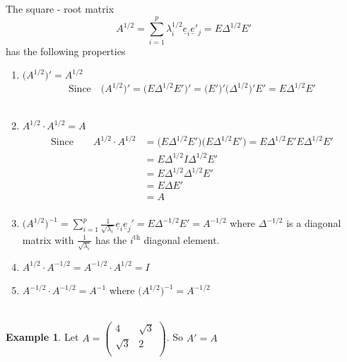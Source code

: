 \documentclass[11pt,a4paper]{article}
\theoremstyle{definition}
\newtheorem{exa}[thm]{Example}
\begin{document}
The square - root matrix \begin{equation}\tag{2}
A^{1/2} = \sum^p_{i=1}\lambda^{1/2}_i\underline{e}_i\underline{e}'_j = E\Delta^{1/2} E'
\end{equation} has the following properties
\begin{enumerate}
\item $\big(A^{1/2}\big)' = A^{1/2}$ 
$$\text{Since}\quad \big(A^{1/2}\big)' = \big(E\Delta^{1/2}E'\big)' = \big(E'\big)'\big(\Delta^{1/2}\big)'E' = E\Delta^{1/2}E'$$\\

\item $A^{1/2}\cdot A^{1/2} = A$
\begin{align*}
\text{Since}\qquad   A^{1/2}\cdot A^{1/2} & = \big(E\Delta^{1/2}E'\big)\big(E\Delta^{1/2}E'\big) = E\Delta^{1/2}E'E\Delta^{1/2}E'\\
& = E\Delta^{1/2}I\Delta^{1/2}E'\\
& = E \Delta^{1/2}\Delta^{1/2}E'\\
& = E \Delta E'\\
& = A\\
\end{align*}

\item $\displaystyle{\big(A^{1/2}\big)^{-1} = \sum^p_{i=1}\frac{1}{\sqrt{\lambda_i}}\underline{e}_i\underline{e}_j' = E\Delta^{-1/2}E' = A^{-1/2}}$ where $\Delta^{-1/2}$ is a diagonal matrix with $\frac{1}{\sqrt{\lambda_i}}$ has the $i^{\text{th}}$ diagonal element.\\

\item $A^{1/2}\cdot A^{-1/2} = A^{-1/2}\cdot A^{1/2} = I$\\

\item $\displaystyle{A^{-1/2}\cdot A^{-1/2}= A^{-1}}$ where $\big(A^{1/2}\big)^{-1} = A^{-1/2}$\\\\
\end{enumerate}



\begin{exa}
Let $A = \begin{pmatrix}
4 & \sqrt{3}\\
\sqrt{3} & 2\\
\end{pmatrix}$. So $A' = A$\\\\
\end{exa}
\end{document}
